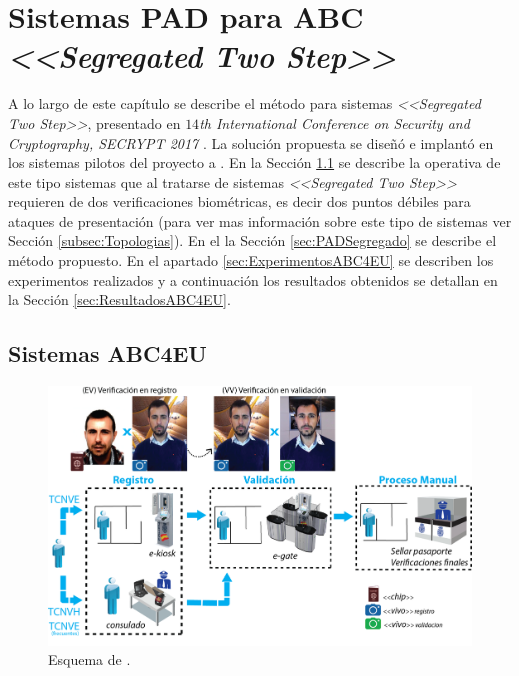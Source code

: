 \chapter{Sistemas PAD para ABC \textit{<<Segregated Two Step>>}}\label{ch:EVALUACIONACION_TOPOLOGIAS}

A lo largo de este capítulo se describe el método  para sistemas  \textit{<<Segregated Two Step>>}, presentado en \textit{$14$th International Conference on Security and Cryptography, SECRYPT 2017}  \cite{del2017face}. La solución propuesta se diseñó e implantó en los sistemas pilotos  del proyecto a . En la Sección \ref{sec:SisABC4EU} se describe la operativa de este tipo sistemas que al tratarse de sistemas \textit{<<Segregated Two Step>>} requieren de dos verificaciones biométricas, es decir dos puntos débiles para ataques de presentación (para ver mas información sobre este tipo de sistemas ver Sección \ref{subsec:Topologias}). En el la Sección \ref{sec:PADSegregado} se describe el método  propuesto. En el apartado \ref{sec:ExperimentosABC4EU} se describen los experimentos realizados y a continuación los resultados obtenidos se detallan en la Sección \ref{sec:ResultadosABC4EU}. 


\section{Sistemas ABC4EU}\label{sec:SisABC4EU}

\begin{figure}
\centering
    \includegraphics[width=\textwidth]{ch-sistemasABC/images/ch-evaluacion_topologias/ARQUIETECTURA_ABC_ABC4UE.png}
    \caption{Esquema de .}
    \label{fig:EsquemaABC4EU}
\end{figure}

